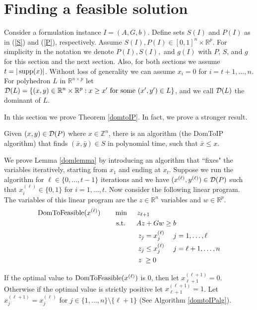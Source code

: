 \section{Finding a feasible solution}\label{domTOIP}
Consider a formulation instance $I=(A,G,b)$. Define sets $S(I)$ and $P(I)$ as in (\ref{S}) and (\ref{P}), respectively. Assume $S(I),P(I)\in [0,1]^n\times \mathbb{R}^p$. For simplicity in the notation we denote $P(I),S(I),$ and $g(I)$ with $P$, $S$, and $g$ for this section and the next section. Also, for both sections we assume $t=|\operatorname{supp}(x)|$. Without loss of generality we can assume $x_i = 0$ for $i=t+1,\ldots,n$. For polyhedron $L$ in $\mathbb{R}^{n\times p}$ let $\operatorname{\mathcal{D}}(L)= \{(x,y)\in \mathbb{R}^n\times \mathbb{R}^p: x\geq x' \text{ for some } (x',y')\in L\}$, and we call $\operatorname{\mathcal{D}}(L)$ the dominant of $L$.

In this section we prove Theorem \ref{domtoIP}. In fact, we prove a stronger result. 
\begin{lemma}\label{domlemma}
	Given $(x,y)\in \operatorname{\mathcal{D}}(P)$ where $x\in \mathbb{Z}^n$, there is an algorithm (the DomToIP algorithm) that finds $(\bar{x},\bar{y})\in S$ in polynomial time, such that $\bar{x}\leq x$.\end{lemma}


We prove Lemma \ref{domlemma} by introducing an algorithm that ``fixes" the variables iteratively, starting from $x_1$ and ending at $x_t$. Suppose we run the algorithm for $\ell\in \{0,\ldots,t-1\}$ iterations and we have $(x^{(\ell)},y^{(\ell)})\in \operatorname{\mathcal{D}}(P)$  such that $x^{(\ell)}_i\in \{0,1\}$ for $i=1,\ldots,t$. Now consider the following linear program. The variables of this linear program are the $z\in \mathbb{R}^n$ variables and $w\in \mathbb{R}^p$.
\begin{align}
	\DOMtoS(x^{(\ell)})\quad\quad& \min\quad \;z_{\ell+1}\\
	&\;\text{s.t.} \quad \;\;Az+ Gw\geq b \\
	&\;{\color{white}{\text{s.t.}} }\quad \;\; \; z_j = x^{(\ell)}_j \quad \; j =1,\ldots, \ell\\
	&\;{\color{white}{\text{s.t.}} }\quad \; \;\; z_j \leq x^{(\ell)}_j \quad \; j = \ell+1,\ldots,n\\
	&\;{\color{white}{\text{s.t.}} }\quad \; \;\; z\;\geq 0
\end{align}

If the optimal value to $\operatorname{DomToFeasible}(x^{(\ell)})$ is 0, then let $x^{(\ell+1)}_{\ell+1} = 0$. Otherwise if the optimal value is strictly positive let $x^{(\ell+1)}_{\ell+1} = 1$. Let $x^{(\ell+1)}_j = x^{(\ell)}_j$ for $j\in \{1,\ldots,n\}\setminus \{\ell+1\}$ (See Algorithm \ref{domtoIPalg}).

